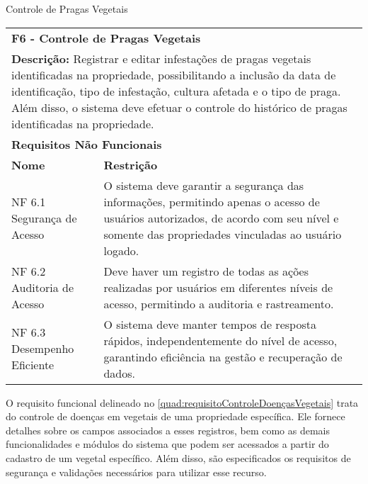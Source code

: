 \begin{tabframed}[htb]
  \caption{Controle de Pragas Vegetais}
  \label{quad:requisitoControlePragasVegetais}
  \renewcommand{\arraystretch}{1.5}
  \begin{tabular}{|l|l|}
    \cline{1-2}
    \multicolumn{2}{|l|}{\textbf{F6 - Controle de Pragas Vegetais}}
    \\ \cline{1-2}

    \multicolumn{2}{|p{15cm}|}{
    \raggedright \textbf{Descrição:} Registrar e editar infestações de pragas vegetais identificadas na propriedade, possibilitando a inclusão da data de identificação, tipo de infestação, cultura afetada e o tipo de praga. Além disso, o sistema deve efetuar o controle do histórico de pragas identificadas na propriedade.
    }
    \\ \cline{1-2}

    \multicolumn{2}{|l|}{\textbf{Requisitos Não Funcionais}}
    \\ \cline{1-2}

    \textbf{Nome}               &
    \textbf{Restrição}
    \\ \cline{1-2}

    NF 6.1 Segurança de Acesso  &
    \multicolumn{1}{|p{8cm}|}{\raggedright O sistema deve garantir a segurança das informações, permitindo apenas o acesso de usuários autorizados, de acordo com seu nível e somente das propriedades vinculadas ao usuário logado.}
    \\ \cline{1-2}

    NF 6.2 Auditoria de Acesso  &
    \multicolumn{1}{|p{8cm}|}{\raggedright Deve haver um registro de todas as ações realizadas por usuários em diferentes níveis de acesso, permitindo a auditoria e rastreamento.}
    \\ \cline{1-2}

    NF 6.3 Desempenho Eficiente &
    \multicolumn{1}{|p{8cm}|}{\raggedright O sistema deve manter tempos de resposta rápidos, independentemente do nível de acesso, garantindo eficiência na gestão e recuperação de dados.}
    \\ \cline{1-2}
  \end{tabular}
  \fonte{} %
\end{tabframed}

O requisito funcional delineado no \autoref{quad:requisitoControleDoençasVegetais} trata do controle de doenças em vegetais de uma propriedade específica. Ele fornece detalhes sobre os campos associados a esses registros, bem como as demais funcionalidades e módulos do sistema que podem ser acessados a partir do cadastro de um vegetal específico. Além disso, são especificados os requisitos de segurança e validações necessários para utilizar esse recurso.

